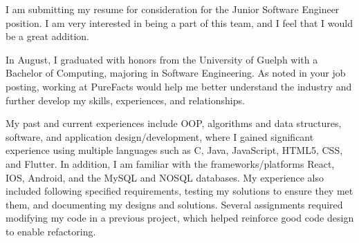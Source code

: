 \documentclass[11pt, a4paper]{awesome-cv} %
\begin{document}
\makecvheader %

\makelettertitle %


\begin{cvletter}






I am submitting my resume for consideration for the Junior Software Engineer position. I am very interested in being a part of this team, 
and I feel that I would be a great addition.

In August, I graduated with honors from the University of Guelph with a Bachelor of Computing, majoring in
Software Engineering. As noted in your job posting, working at PureFacts would help me better understand the
industry and further develop my skills, experiences, and relationships.



My past and current experiences include OOP, algorithms and data structures, software, and application
design/development, where I gained significant experience using multiple languages such as C, Java,
JavaScript, HTML5, CSS, and Flutter. In addition, I am familiar with the frameworks/platforms React, IOS,
Android, and the MySQL and NOSQL databases. My experience also included following specified
requirements, testing my solutions to ensure they met them, and documenting my designs and solutions. Several
assignments required modifying my code in a previous project, which helped reinforce good code design to
enable refactoring. 


\end{cvletter}
\end{document}
